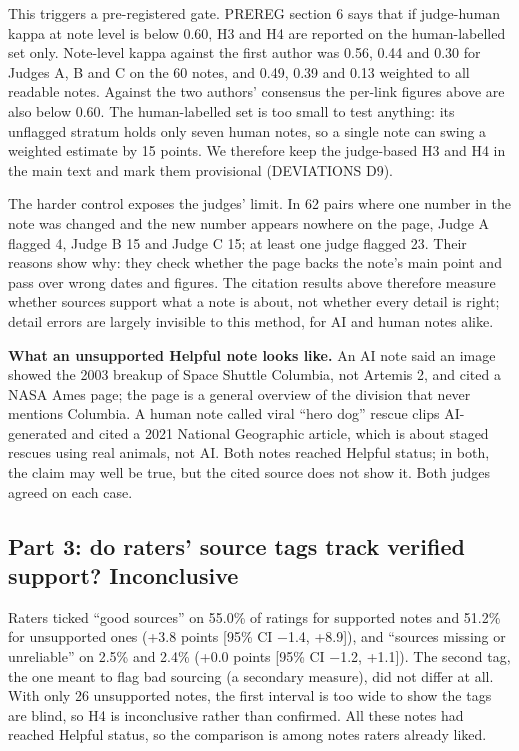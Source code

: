 \documentclass[10.5pt]{article}
\begin{document}
This triggers a pre-registered gate. PREREG section 6 says that if judge-human kappa at note level is below 0.60, H3 and H4 are reported on the human-labelled set only. Note-level kappa against the first author was 0.56, 0.44 and 0.30 for Judges A, B and C on the 60 notes, and 0.49, 0.39 and 0.13 weighted to all readable notes. Against the two authors' consensus the per-link figures above are also below 0.60. The human-labelled set is too small to test anything: its unflagged stratum holds only seven human notes, so a single note can swing a weighted estimate by 15 points. We therefore keep the judge-based H3 and H4 in the main text and mark them provisional (DEVIATIONS D9).

The harder control exposes the judges' limit. In 62 pairs where one number in the note was changed and the new number appears nowhere on the page, Judge A flagged 4, Judge B 15 and Judge C 15; at least one judge flagged 23. Their reasons show why: they check whether the page backs the note's main point and pass over wrong dates and figures. The citation results above therefore measure whether sources support what a note is about, not whether every detail is right; detail errors are largely invisible to this method, for AI and human notes alike.

\begin{tcolorbox}[colback=white,colframe=accent,boxrule=0.6pt,arc=2pt,left=8pt,right=8pt,top=5pt,bottom=5pt]\small{\sffamily\bfseries\color{accent} What an unsupported Helpful note looks like.} An AI note said an image showed the 2003 breakup of Space Shuttle Columbia, not Artemis 2, and cited a NASA Ames page; the page is a general overview of the division that never mentions Columbia. A human note called viral ``hero dog'' rescue clips AI-generated and cited a 2021 National Geographic article, which is about staged rescues using real animals, not AI. Both notes reached Helpful status; in both, the claim may well be true, but the cited source does not show it. Both judges agreed on each case.\end{tcolorbox}
\subsection*{Part 3: do raters' source tags track verified support? Inconclusive}
Raters ticked ``good sources'' on 55.0\% of ratings for supported notes and 51.2\% for unsupported ones (+3.8 points [95\% CI −1.4, +8.9]), and ``sources missing or unreliable'' on 2.5\% and 2.4\% (+0.0 points [95\% CI −1.2, +1.1]). The second tag, the one meant to flag bad sourcing (a secondary measure), did not differ at all. With only 26 unsupported notes, the first interval is too wide to show the tags are blind, so H4 is inconclusive rather than confirmed. All these notes had reached Helpful status, so the comparison is among notes raters already liked.
\end{document}
